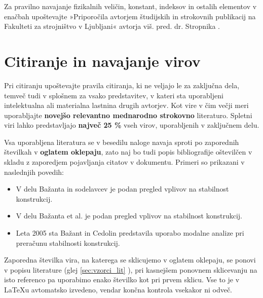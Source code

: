 Za pravilno navajanje fizikalnih veličin, konstant, indeksov in ostalih elementov v enačbah upoštevajte »Priporočila avtorjem študijskih in strokovnih publikacij na Fakulteti za strojništvo v Ljubljani« avtorja viš. pred. dr. Stropnika \cite{stropnik_1997}.

\section{Citiranje in navajanje virov}\label{sec:citiranje}

Pri citiranju upoštevajte pravila citiranja, ki ne veljajo le za zaključna dela, temveč tudi v splošnem za vsako predstavitev, v kateri sta uporabljeni intelektualna ali materialna lastnina drugih avtorjev. Kot vire v čim večji meri uporabljajte \textbf{novejšo relevantno mednarodno strokovno} literaturo. Spletni viri lahko predstavljajo \textbf{največ 25 \%} vseh virov, uporabljenih v zaključnem delu.

Vsa uporabljena literatura se v besedilu naloge navaja sproti po zaporednih številkah v \textbf{oglatem oklepaju}, zato naj bo tudi popis bibliografije oštevilčen v skladu z zaporedjem pojavljanja citatov v dokumentu. Primeri so prikazani v naslednjih povedih:
\begin{itemize}
	\item V delu Bažanta in sodelavcev \cite{bazant_1991} je podan pregled vplivov na stabilnost konstrukcij.
	\item V delu Bažanta et al. \cite{bazant_1991} je podan pregled vplivov na stabilnost konstrukcij.
	\item Leta 2005 sta Bažant in Cedolin \cite{bazant_1991} predstavila uporabo modalne analize pri preračunu stabilnosti konstrukcij.
\end{itemize}

Zaporedna številka vira, na katerega se sklicujemo v oglatem oklepaju, se ponovi v popisu literature (glej \ref{sec:vzorci_lit} ), pri kasnejšem ponovnem sklicevanju na isto referenco pa uporabimo enako številko kot pri prvem sklicu. Vse to je v \LaTeX u avtomatsko izvedeno, vendar končna kontrola vsekakor ni odveč.

